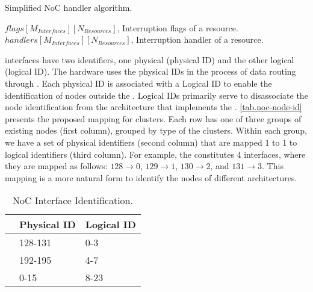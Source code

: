 			\begin{algorithm}[!b]
				\caption{Simplified NoC handler algorithm.}%
				\label{alg.noc-handler}%
				\begin{algorithmic}[1]
					\Require $flags[M_{Interfaces}][N_{Resources}]$, Interruption flags of a resource.
					\Require $handlers[M_{Interfaces}][N_{Resources}]$, Interruption handler of a resource.
								   
								         
							\EndIf
						\EndFor
					\EndFor
					\EndProcedure
				\end{algorithmic}%
			\end{algorithm}

			\noc interfaces have two identifiers, one physical (physical ID) and the
			other logical (logical ID). The hardware uses the physical IDs in the
			process of data routing through \noc. Each physical ID is associated with
			a Logical ID to enable the identification of \noc nodes outside the \hal.
			Logical IDs primarily serve to disassociate the node identification from
			the architecture that implements the \hal. \autoref{tab.noc-node-id}
			presents the proposed mapping for \mppa clusters. Each row has one of
			three groups of existing \noc nodes (first column), grouped by type of
			the clusters. Within each group, we have a set of physical identifiers
			(second column) that are mapped 1 to 1 to logical identifiers (third column).
			For example, the  constitutes 4 \noc interfaces, where they are
			mapped as follows: $128 \to 0$, $129 \to 1$, $130 \to 2$, and $131 \to 3$.
			This mapping is a more natural form to identify the \noc nodes of
			different architectures.

			\begin{table}[!tb]
				\centering%
				\caption{NoC Interface Identification.}%
				\label{tab.noc-node-id}%

				\begin{tabular}{l|l|l|}
					\cline{2-3}
															   & \textbf{Physical ID} & \textbf{Logical ID} \\ \hline
					\multicolumn{1}{|l|}{\textbf{\iocluster0}} & 128-131              & 0-3                 \\ \hline
					\multicolumn{1}{|l|}{\textbf{\iocluster1}} & 192-195              & 4-7                 \\ \hline
					\multicolumn{1}{|l|}{\textbf{\cclusters}}  & 0-15                 & 8-23                \\ \hline
				\end{tabular}

			\end{table}

